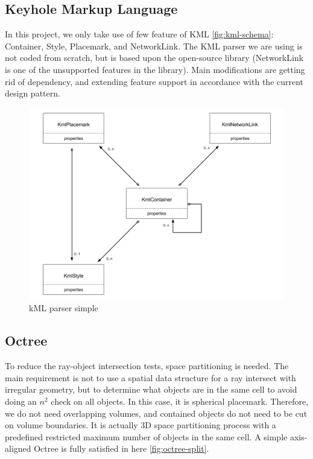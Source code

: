 \subsection{Keyhole Markup Language}
\label{section:kml}

In this project, we only take use of few feature of KML \ref{fig:kml-schema}: Container, Style, Placemark,  and NetworkLink. The KML parser we are using is not coded from scratch, but is based upon the open-source library  \cite{google.code-kml.2016} (NetworkLink is one of the unsupported features in the library). Main modifications are getting rid of  dependency, and extending  feature support in accordance with the current design pattern.

\begin{figure}[H]
\caption{kML parser simple}
\label{fig:kml-parser-simple}
\centering
\includegraphics[width=\linewidth]{Figures/kml-parser-simple.png}
\decoRule
\end{figure}

\subsection{Octree} 
\label{section:octree}

To reduce the ray-object intersection tests,  space partitioning is needed. The main requirement is not to use a spatial data structure for a ray intersect with irregular geometry, but to determine what objects are in the same cell to avoid doing an $n^2$ check on all objects. In this case, it is spherical placemark. Therefore, we do not need overlapping volumes, and contained objects do not need to be cut on volume boundaries. It is actually 3D space partitioning process with a predefined restricted maximum number of objects in the same cell. A simple axis-aligned Octree is fully satisfied in here \ref{fig:octree-split}.

